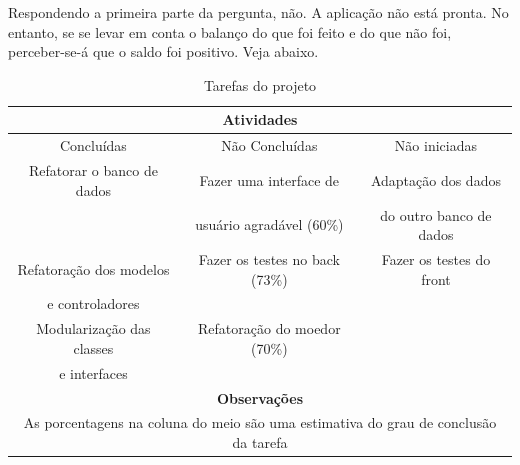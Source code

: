 Respondendo a primeira parte da pergunta, não. A aplicação não está pronta. No entanto, se se levar em conta
o balanço do que foi feito e do que não foi, perceber-se-á que o saldo foi positivo. Veja abaixo.

\begin{table}[h]
    \centering
    \begin{tabular}{|c|c|c|}
        \hline
        \multicolumn{3}{|c|}{Atividades} \\ \hline\hline
        Concluídas & Não Concluídas & Não iniciadas \\ \hline
        Refatorar o banco de dados & Fazer uma interface de  & Adaptação dos dados \\
        & usuário agradável (60\%) & do outro banco de dados \\ \hline
        Refatoração dos modelos  & Fazer os testes no back (73\%) & Fazer os testes do front \\
        e controladores & & \\ \hline
        Modularização das classes & Refatoração do moedor (70\%) & \\
        e interfaces  & & \\ \hline\hline
        \multicolumn{3}{|c|}{\textbf{Observações}} \\ \hline
        \multicolumn{3}{|c|}{As porcentagens na coluna do meio são uma estimativa do grau de conclusão da tarefa} \\ \hline
    \end{tabular}
    \caption{Tarefas do projeto}
    \label{table:activity}
\end{table}